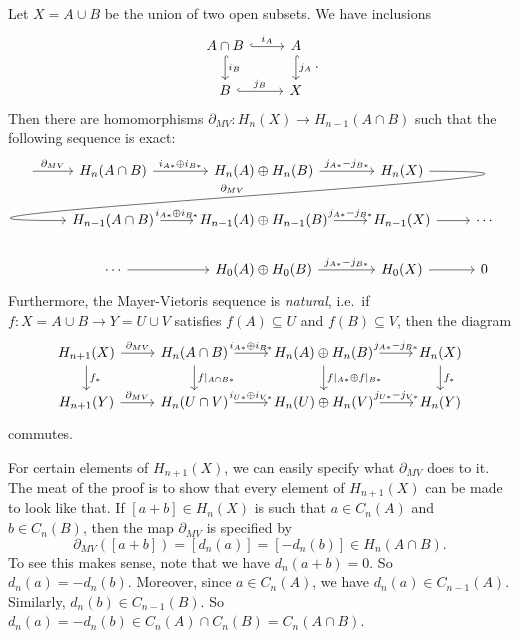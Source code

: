 \documentclass[a4paper]{article}
\theoremstyle{definition}
\begin{document}
\begin{thm}
  Let $X = A \cup B$ be the union of two open subsets. We have inclusions
  \[
    \begin{tikzcd}
      A \cap B \ar[r, "i_A", hook] \ar[d, "i_B", hook] & A \ar[d, hook, "j_A"]\\
      B \ar[r, hook, "j_B"] & X
    \end{tikzcd}.
  \]
  Then there are homomorphisms $\partial_{MV}: H_n(X) \to H_{n - 1}(A \cap B)$ such that the following sequence is exact:
  \[
    \begin{tikzcd}
      \ar[r, "\partial_{MV}"] & H_n(A \cap B) \ar[r, "i_{A*} \oplus i_{B*}"] & H_n(A) \oplus H_n(B) \ar[r, "j_{A*} - j_{B*}"] & H_n(X)\ar[out=0, in=180, looseness=2, overlay, lld, "\partial_{MV}"']\\
      & H_{n - 1}(A \cap B) \ar[r, "i_{A*} \oplus i_{B*}"] & H_{n - 1}(A) \oplus H_{n - 1}(B) \ar[r, "j_{A*} - j_{B*}"] & H_{n - 1}(X) \ar [r] & \cdots\\
      &\cdots \ar[r] & H_0(A) \oplus H_0(B) \ar[r, "j_{A*} - j_{B*}"] & H_0(X) \ar [r] & 0
    \end{tikzcd}
  \]
  Furthermore, the Mayer-Vietoris sequence is \emph{natural}, i.e.\ if $f: X = A\cup B \to Y = U \cup V$ satisfies $f(A) \subseteq U$ and $f(B) \subseteq V$, then the diagram
  \[
    \begin{tikzcd}
       H_{n + 1}(X) \ar[r, "\partial_{MV}"] \ar[d, "f_*"] & H_{n}(A \cap B) \ar[r, "i_{A*} \oplus i_{B*}"] \ar[d, "f|_{A \cap B*}"] & H_n(A) \oplus H_n(B) \ar[r, "j_{A*} - j_{B*}"] \ar[d, "f|_{A*} \oplus f|_{B*}"] & H_n(X) \ar[d, "f_*"]\\
       H_{n + 1}(Y) \ar[r, "\partial_{MV}"] & H_{n}(U \cap V) \ar[r, "i_{U*} \oplus i_{V*}"] & H_n(U) \oplus H_n(V) \ar[r, "j_{U*} - j_{V*}"] & H_n(Y)
    \end{tikzcd}
  \]
  commutes.
\end{thm}
For certain elements of $H_{n + 1}(X)$, we can easily specify what $\partial_{MV}$ does to it. The meat of the proof is to show that every element of $H_{n + 1}(X)$ can be made to look like that. If $[a + b] \in H_n(X)$ is such that $a \in C_n(A)$ and $b \in C_n(B)$, then the map $\partial_{MV}$ is specified by
\[
  \partial_{MV}([a + b]) = [d_n(a)] = [-d_n(b)] \in H_n(A \cap B).
\]
To see this makes sense, note that we have $d_n(a + b) = 0$. So $d_n(a) = - d_n(b)$. Moreover, since $a \in C_n(A)$, we have $d_n(a) \in C_{n - 1}(A)$. Similarly, $d_n(b) \in C_{n - 1}(B)$. So $d_n(a) = - d_n(b) \in C_n(A) \cap C_n(B) = C_n(A \cap B)$.
\end{document}
